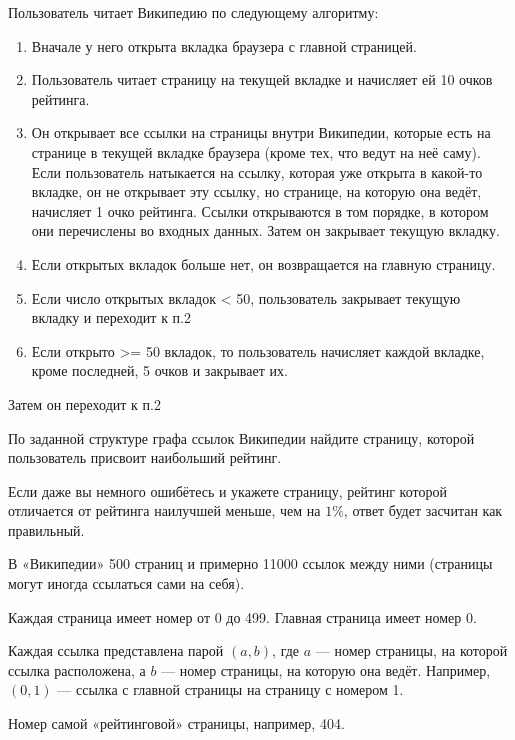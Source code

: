 
Пользователь читает Википедию по следующему алгоритму:

\begin{enumerate}
    \item Вначале у него открыта вкладка браузера с главной страницей.
    \item Пользователь читает страницу на текущей вкладке и начисляет ей 10 очков рейтинга.
    \item Он открывает все ссылки на страницы внутри Википедии, которые есть на странице в текущей вкладке браузера (кроме тех, что ведут на неё саму). Если пользователь натыкается на ссылку, которая уже открыта в какой-то вкладке, он не открывает эту ссылку, но странице, на которую она ведёт, начисляет 1 очко рейтинга. Ссылки открываются в том порядке, в котором они перечислены во входных данных. Затем он закрывает текущую вкладку.
    \item Если открытых вкладок больше нет, он возвращается на главную страницу.
    \item Если число открытых вкладок < 50, пользователь закрывает текущую вкладку и переходит к п.2
    \item Если открыто >= 50 вкладок, то пользователь начисляет каждой вкладке, кроме последней, 5 очков и закрывает их.
\end{enumerate}

Затем он переходит к п.2

По заданной структуре графа ссылок Википедии найдите страницу, которой пользователь присвоит 
наибольший рейтинг.

Если даже вы немного ошибётесь и укажете страницу, рейтинг которой отличается от рейтинга 
наилучшей меньше, чем на $1\%$, ответ будет засчитан как правильный.


В «Википедии» 500 страниц и примерно 11000 ссылок между ними (страницы могут иногда ссылаться сами на себя).

Каждая страница имеет номер от 0 до 499. Главная страница имеет номер 0.

Каждая ссылка представлена парой $(a,b)$, где $a$ — номер страницы, на которой ссылка расположена, 
а $b$ — номер страницы, на которую она ведёт. Например, $(0,1)$ — ссылка с главной страницы на страницу 
с номером 1.

\outputfmtSection

Номер самой «рейтинговой» страницы, например, 404.

